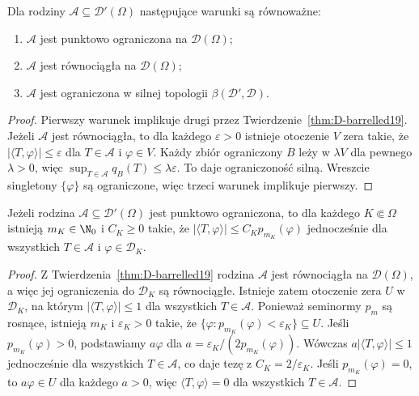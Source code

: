 \begin{wniosek}
\label{cor:bounded-distributions19}
Dla rodziny $\mathcal A\subseteq\mathcal D'(\Omega)$
następujące warunki są równoważne:
\begin{enumerate}
\item $\mathcal A$ jest punktowo ograniczona na $\mathcal D(\Omega)$;
\item $\mathcal A$ jest równociągła na $\mathcal D(\Omega)$;
\item $\mathcal A$ jest ograniczona w silnej topologii
$\beta(\mathcal D',\mathcal D)$.
\end{enumerate}
\end{wniosek}
\begin{proof}
Pierwszy warunek implikuje drugi przez
Twierdzenie~\ref{thm:D-barrelled19}. Jeżeli
$\mathcal A$ jest równociągła, to dla każdego
$\varepsilon>0$ istnieje otoczenie $V$ zera takie,
że $|\langle T,\varphi\rangle|\le\varepsilon$ dla
$T\in\mathcal A$ i $\varphi\in V$.
Każdy zbiór ograniczony $B$ leży w $\lambda V$
dla pewnego $\lambda>0$, więc
$\sup_{T\in\mathcal A}q_B(T)\le\lambda\varepsilon$.
To daje ograniczoność silną. Wreszcie singletony
$\{\varphi\}$ są ograniczone, więc trzeci warunek
implikuje pierwszy.
\end{proof}

\begin{wniosek}
\label{cor:uniform-order19}
Jeżeli rodzina $\mathcal A\subseteq\mathcal D'(\Omega)$ jest
punktowo ograniczona, to dla każdego $K\Subset\Omega$
istnieją $m_K\in\N_0$ i $C_K\ge0$ takie, że
$|\langle T,\varphi\rangle|\le C_Kp_{m_K}(\varphi)$
jednocześnie dla wszystkich $T\in\mathcal A$
i $\varphi\in\mathcal D_K$.
\end{wniosek}
\begin{proof}
Z Twierdzenia~\ref{thm:D-barrelled19} rodzina $\mathcal A$
jest równociągła na $\mathcal D(\Omega)$, a więc jej
ograniczenia do $\mathcal D_K$ są równociągłe.
Istnieje zatem otoczenie zera $U$ w $\mathcal D_K$,
na którym $|\langle T,\varphi\rangle|\le1$ dla wszystkich
$T\in\mathcal A$. Ponieważ seminormy $p_m$ są rosnące,
istnieją $m_K$ i $\varepsilon_K>0$ takie, że
$\{\varphi:p_{m_K}(\varphi)<\varepsilon_K\}\subseteq U$.
Jeśli $p_{m_K}(\varphi)>0$, podstawiamy
$a\varphi$ dla $a=\varepsilon_K/(2p_{m_K}(\varphi))$.
Wówczas $a|\langle T,\varphi\rangle|\le1$
jednocześnie dla wszystkich $T\in\mathcal A$,
co daje tezę z $C_K=2/\varepsilon_K$.
Jeśli $p_{m_K}(\varphi)=0$, to $a\varphi\in U$
dla każdego $a>0$, więc $\langle T,\varphi\rangle=0$
dla wszystkich $T\in\mathcal A$.
\end{proof}

